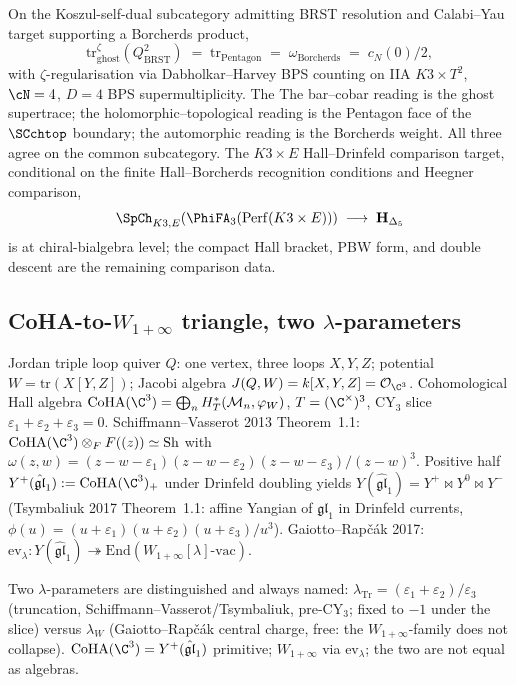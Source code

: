 On the Koszul-self-dual subcategory admitting BRST resolution and
Calabi--Yau target supporting a Borcherds product,
\[
 \mathrm{tr}^{\zeta}_{\mathrm{ghost}}(Q_{\mathrm{BRST}}^2)
 \;=\; \mathrm{tr}_{\mathrm{Pentagon}}
 \;=\; \omega_{\mathrm{Borcherds}}
 \;=\; c_N(0)/2,
\]
with $\zeta$-regularisation via Dabholkar--Harvey BPS counting on
IIA $K3\times T^2$, $\cN=4$, $D=4$ BPS supermultiplicity. The
The bar--cobar reading is the ghost supertrace; the holomorphic--topological
reading is the Pentagon face of the $\SCchtop$ boundary; the automorphic
reading is the Borcherds weight. All three agree on the common subcategory. The
$K3\times E$ Hall--Drinfeld comparison target, conditional on the finite
Hall--Borcherds recognition conditions and Heegner comparison,
\[
 \SpCh_{K3,E}(\PhiFA_3(\mathrm{Perf}(K3\times E))) \;\longrightarrow\; \mathbf H_{\Delta_5}
\]
is at chiral-bialgebra level; the compact Hall bracket, PBW form, and
double descent are the remaining comparison data.

\subsection{CoHA-to-\texorpdfstring{$W_{1+\infty}$}{W1+inf} triangle, two \texorpdfstring{$\lambda$}{lambda}-parameters}
\label{subsec:v3-intro-coha-triangle}

Jordan triple loop quiver $Q$: one vertex, three loops $X,Y,Z$;
potential $W=\mathrm{tr}(X[Y,Z])$; Jacobi algebra
$J(Q,W)=k[X,Y,Z]=\cO_{\C^3}$. Cohomological Hall algebra
$\CoHA(\C^3) = \bigoplus_n H^{\ast}_T(\cM_n,\varphi_W)$,
$T=(\C^\times)^3$, CY$_3$ slice
$\varepsilon_1+\varepsilon_2+\varepsilon_3=0$. Schiffmann--Vasserot
2013 Theorem~1.1:
$\CoHA(\C^3)\otimes_F F((z))\simeq\mathrm{Sh}$ with
$\omega(z,w)=(z-w-\varepsilon_1)(z-w-\varepsilon_2)(z-w-\varepsilon_3)/(z-w)^3$.
Positive half $Y^+(\hat{\mathfrak{gl}}_1) := \CoHA(\C^3)_+$ under
Drinfeld doubling yields
$Y(\hat{\mathfrak{gl}}_1) = Y^+\bowtie Y^0\bowtie Y^-$
(Tsymbaliuk 2017 Theorem~1.1: affine Yangian of $\mathfrak{gl}_1$
in Drinfeld currents,
$\phi(u)=(u+\varepsilon_1)(u+\varepsilon_2)(u+\varepsilon_3)/u^3$).
Gaiotto--Rap\v c\'ak 2017:
$\mathrm{ev}_\lambda\colon Y(\hat{\mathfrak{gl}}_1)\twoheadrightarrow
\mathrm{End}(W_{1+\infty}[\lambda]\text{-vac})$.

Two $\lambda$-parameters are distinguished and always named:
$\lambda_{\mathrm{Tr}} = (\varepsilon_1+\varepsilon_2)/\varepsilon_3$
(truncation, Schiffmann--Vasserot/Tsymbaliuk, pre-CY$_3$; fixed to
$-1$ under the slice) versus $\lambda_W$ (Gaiotto--Rap\v c\'ak
central charge, free: the $W_{1+\infty}$-family does not collapse).
$\CoHA(\C^3) = Y^+(\hat{\mathfrak{gl}}_1)$ primitive; $W_{1+\infty}$
via $\mathrm{ev}_\lambda$; the two are not equal as algebras.

